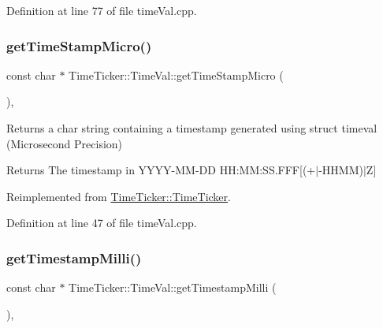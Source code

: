 Definition at line 77 of file time\+Val.\+cpp.

\mbox{\label{classTimeTicker_1_1TimeVal_a7f874b58b0af4de06be9426ab43f3a0d}} 
\subsubsection{\texorpdfstring{getTimeStampMicro()}{getTimeStampMicro()}}
{\footnotesize\ttfamily const char $\ast$ Time\+Ticker\+::\+Time\+Val\+::get\+Time\+Stamp\+Micro (\begin{DoxyParamCaption}{ }\end{DoxyParamCaption})\hspace{0.3cm}{\ttfamily [override]}, {\ttfamily [virtual]}}



Returns a char string containing a timestamp generated using struct timeval (Microsecond Precision) 

\begin{DoxyReturn}{Returns}
The timestamp in Y\+Y\+Y\+Y-\/\+M\+M-\/\+DD H\+H\+:\+MM\+:S\+S.\+F\+FF\mbox{[}(+$\vert$-\/\+H\+H\+MM)$\vert$Z\mbox{]} 
\end{DoxyReturn}


Reimplemented from \mbox{\hyperlink{classTimeTicker_1_1TimeTicker}{Time\+Ticker\+::\+Time\+Ticker}}.



Definition at line 47 of file time\+Val.\+cpp.

\mbox{\label{classTimeTicker_1_1TimeVal_a9a5456bb38407bc436649431e3f026b1}} 
\subsubsection{\texorpdfstring{getTimestampMilli()}{getTimestampMilli()}}
{\footnotesize\ttfamily const char $\ast$ Time\+Ticker\+::\+Time\+Val\+::get\+Timestamp\+Milli (\begin{DoxyParamCaption}{ }\end{DoxyParamCaption})\hspace{0.3cm}{\ttfamily [override]}, {\ttfamily [virtual]}}



